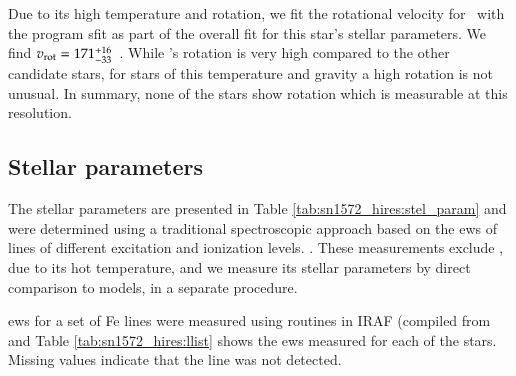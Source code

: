 Due to its high temperature and rotation, we fit the rotational velocity for \starb\ with the program \gls{sfit} \citep[][described in section \ref{sec:stellar-parameters}]{2001A&A...376..497J}  as part of the overall fit for this star's stellar parameters.  We find $v_{\textrm{rot}}=171^{+16}_{-33}$~\kms. While \starb's rotation is very high compared to the other candidate stars,  for stars of this temperature and gravity a high rotation is not unusual. In summary, none of the stars show rotation which is measurable at this resolution.


\subsection{Stellar parameters}
\label{sec:stellar-parameters}
The stellar parameters are presented in Table \ref{tab:sn1572_hires:stel_param} and were determined using a traditional spectroscopic approach based on the \glspl{ew} of lines of different excitation and ionization levels. . These measurements exclude \starb, due to its hot temperature, and we measure its stellar parameters by direct comparison to models, in a separate procedure.

\glspl{ew} for a set of Fe lines were measured using routines in IRAF (compiled from \citet[][henceforth Reddy03]{2003MNRAS.340..304R} and \citet[][henceforth RC02]{2002AJ....123.3277R} Table \ref{tab:sn1572_hires:llist} shows the \glspl{ew} measured for each of the stars. Missing values indicate that the line was not detected. 

